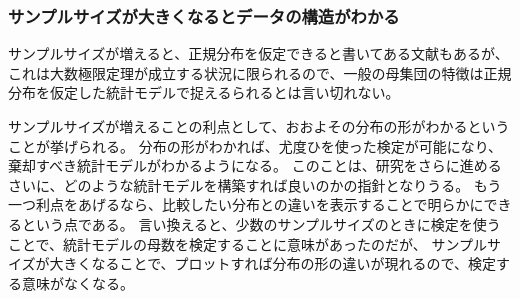\subsubsection{ サンプルサイズが大きくなるとデータの構造がわかる}
サンプルサイズが増えると、正規分布を仮定できると書いてある文献もあるが、これは大数極限定理が成立する状況に限られるので、一般の母集団の特徴は正規分布を仮定した統計モデルで捉えるられるとは言い切れない。


サンプルサイズが増えることの利点として、おおよその分布の形がわかるということが挙げられる。
分布の形がわかれば、尤度ひを使った検定が可能になり、棄却すべき統計モデルがわかるようになる。
このことは、研究をさらに進めるさいに、どのような統計モデルを構築すれば良いのかの指針となりうる。
もう一つ利点をあげるなら、比較したい分布との違いを表示することで明らかにできるという点である。
言い換えると、少数のサンプルサイズのときに検定を使うことで、統計モデルの母数を検定することに意味があったのだが、
サンプルサイズが大きくなることで、プロットすれば分布の形の違いが現れるので、検定する意味がなくなる。
\fi

